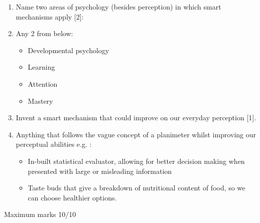 \documentclass[12pt,english]{scrartcl}
\begin{document}
\begin{enumerate}
 \color{black}
 \item Name two areas of psychology (besides perception) in which smart mechanisms apply [2]:
 \item[]
 \color{blue}
 Any 2 from below:
 \begin{itemize}
  \item Developmental psychology
  \item Learning
  \item Attention
  \item Mastery
 \end{itemize}

 \color{black}
 \item Invent a smart mechanism that could improve on our everyday perception [1].
 \item[]
 \color{blue}
 Anything that follows the vague concept of a planimeter whilst improving our perceptual abilities e.g. : 
  \begin{itemize}
   \item In-built statistical evaluator, allowing for better decision making when presented with large or misleading information
   \item Taste buds that give a breakdown of nutritional content of food, so we can choose healthier options. 
  \end{itemize}

\end{enumerate}

Maximum marks 10/10
\end{document}
